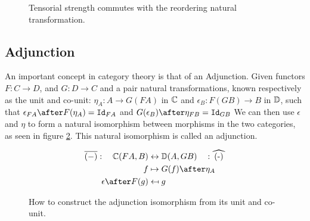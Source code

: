 \documentclass{Report}
\begin{document}
\begin{figure}
    \centering
    \begin{framed}
        \centering
    \end{framed}
    \caption{Tensorial strength commutes with the reordering natural transformation.}
    \label{TensorStrengthAlpha}
\end{figure}






\subsection{Adjunction}\label{WhatsAnAdjunction}
An important concept in category theory is that of an Adjunction. Given functors $F: C\rightarrow D$, and  $G: D\rightarrow C$ and a pair natural transformations, known respectively as the unit and co-unit: $\eta_A: A \rightarrow G(F A)$ in $\mathbb{C}$ and $\epsilon_B: F(G B) \rightarrow B$ in $\mathbb{D}$, such that $\epsilon_{F A}\after F(\eta_A) = \Id{F A}$ and $G(\epsilon_B)\after \eta_{F B} = \Id{G B}$ We can then use $\epsilon$ and $\eta$ to form a natural isomorphism between morphisms in the two categories, as seen in figure \ref{Adjunction}. This natural isomorphism is called an adjunction.


\begin{figure}
    \begin{framed}
    \begin{align*}
        \bar{(-)}: \quad\C(FA, B) &\leftrightarrow \DC(A, GB)   \quad: \widehat{(-)}\\
        f & \mapsto G(f)\after\eta_A \\
        \epsilon\after F(g) & \mapsfrom g\\
    \end{align*}
    \end{framed}
    \caption{How to construct the adjunction isomorphism from its unit and co-unit.}
    \label{Adjunction}
\end{figure}
\end{document}
